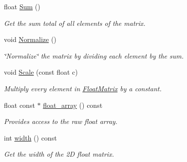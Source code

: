 \begin{DoxyCompactItemize}
float \hyperlink{classimage__tools_1_1FloatMatrix_a34f7a09d3703aafb012a1e0bbb1803f0}{Sum} ()
\begin{DoxyCompactList}\small\item\em Get the sum total of all elements of the matrix. \end{DoxyCompactList}\item 
\mbox{\label{classimage__tools_1_1FloatMatrix_ad638ab60a162b1e1a6afdc377b5a7430}} 
void \hyperlink{classimage__tools_1_1FloatMatrix_ad638ab60a162b1e1a6afdc377b5a7430}{Normalize} ()
\begin{DoxyCompactList}\small\item\em \char`\"{}\+Normalize\char`\"{} the matrix by dividing each element by the sum. \end{DoxyCompactList}\item 
\mbox{\label{classimage__tools_1_1FloatMatrix_a7813f1a7ab6ae97530e18311427bc2fb}} 
void \hyperlink{classimage__tools_1_1FloatMatrix_a7813f1a7ab6ae97530e18311427bc2fb}{Scale} (const float c)
\begin{DoxyCompactList}\small\item\em Multiply every element in \hyperlink{classimage__tools_1_1FloatMatrix}{Float\+Matrix} by a constant. \end{DoxyCompactList}\item 
\mbox{\label{classimage__tools_1_1FloatMatrix_ae56c177031c5a2506fdc63f08705110e}} 
float const  $\ast$ \hyperlink{classimage__tools_1_1FloatMatrix_ae56c177031c5a2506fdc63f08705110e}{float\+\_\+array} () const
\begin{DoxyCompactList}\small\item\em Provides access to the raw float array. \end{DoxyCompactList}\item 
\mbox{\label{classimage__tools_1_1FloatMatrix_a8e6321d90b24d9e4cbf01240d2fd9b88}} 
int \hyperlink{classimage__tools_1_1FloatMatrix_a8e6321d90b24d9e4cbf01240d2fd9b88}{width} () const
\begin{DoxyCompactList}\small\item\em Get the width of the 2D float matrix. \end{DoxyCompactList}\item 

\end{DoxyCompactItemize}
